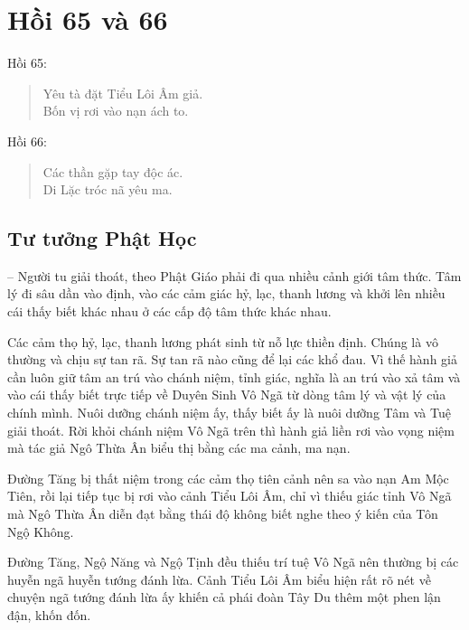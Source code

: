 \chapter{Hồi 65 và 66} %
\label{cha:hoi_65_66}

Hồi 65:

\begin{verse}
\begin{itshape}
Yêu tà đặt Tiểu Lôi Âm giả.\\
Bốn vị rơi vào nạn ách to.
\end{itshape}
\end{verse}

Hồi 66:

\begin{verse}
\begin{itshape}
Các thần gặp tay độc ác.\\
Di Lặc tróc nã yêu ma.
\end{itshape}
\end{verse}

\section{Tư tưởng Phật Học} %
\label{sec:65_66_phat_hoc}

-- Người tu giải thoát, theo Phật Giáo phải đi qua nhiều cảnh giới tâm thức. Tâm lý đi sâu dần vào định, vào các cảm giác hỷ, lạc, thanh lương và khởi lên nhiều cái thấy biết khác nhau ở các cấp độ tâm thức khác nhau.

Các cảm thọ hỷ, lạc, thanh lương phát sinh từ nỗ lực thiền định. Chúng là vô thường và chịu sự tan rã. Sự tan rã nào cũng để lại các khổ đau. Vì thế hành giả cần luôn giữ tâm an trú vào chánh niệm, tỉnh giác, nghĩa là an trú vào xả tâm và vào cái thấy biết trực tiếp về Duyên Sinh Vô Ngã từ dòng tâm lý và vật lý của chính mình. Nuôi dưỡng chánh niệm ấy, thấy biết ấy là nuôi dưỡng Tâm và Tuệ giải thoát. Rời khỏi chánh niệm Vô Ngã trên thì hành giả liền rơi vào vọng niệm mà tác giả Ngô Thừa Ân biểu thị bằng các ma cảnh, ma nạn.

Đường Tăng bị thất niệm trong các cảm thọ tiên cảnh nên sa vào nạn Am Mộc Tiên, rồi lại tiếp tục bị rơi vào cảnh Tiểu Lôi Âm, chỉ vì thiếu giác tỉnh Vô Ngã mà Ngô Thừa Ân diễn đạt bằng thái độ không biết nghe theo ý kiến của Tôn Ngộ Không.

Đường Tăng, Ngộ Năng và Ngộ Tịnh đều thiếu trí tuệ Vô Ngã nên thường bị các huyễn ngã huyễn tướng đánh lừa. Cảnh Tiểu Lôi Âm biểu hiện rất rõ nét về chuyện ngã tướng đánh lừa ấy khiến cả phái đoàn Tây Du thêm một phen lận đận, khốn đốn.

